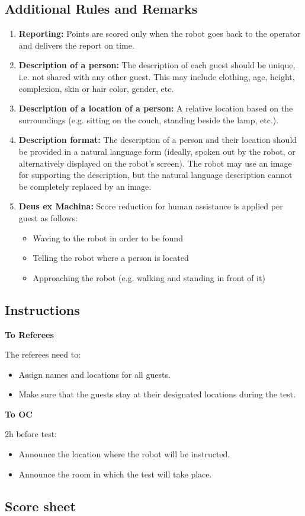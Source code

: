 \subsection*{Additional Rules and Remarks}
\begin{enumerate}[nosep]
	\item \textbf{Reporting:} Points are scored only when the robot goes back to the operator and delivers the report on time.

    \item \textbf{Description of a person:} The description of each guest should be unique, i.e. not shared with any other guest. This may include clothing, age, height, complexion, skin or hair color, gender, etc.

	\item \textbf{Description of a location of a person:} A relative location based on the surroundings (e.g. sitting on the couch, standing beside the lamp, etc.).

    \item \textbf{Description format:} The description of a person and their location should be provided in a natural language form (ideally, spoken out by the robot, or alternatively displayed on the robot's screen).
    The robot may use an image for supporting the description, but the natural language description cannot be completely replaced by an image.

	\item \textbf{Deus ex Machina:} Score reduction for human assistance is applied per guest as follows:

		\begin{itemize}
		    \item Waving to the robot in order to be found
			\item Telling the robot where a person is located
			\item Approaching the robot (e.g. walking and standing in front of it)
		\end{itemize}

\end{enumerate}

\subsection*{Instructions}

\textbf{To Referees}

The referees need to:
\begin{itemize}
	\item Assign names and locations for all guests.
	\item Make sure that the guests stay at their designated locations during the test.
\end{itemize}

\noindent \textbf{To OC}

2h before test:
\begin{itemize}
	\item Announce the location where the robot will be instructed.
	\item Announce the room in which the test will take place.
\end{itemize}

\subsection*{Score sheet}

